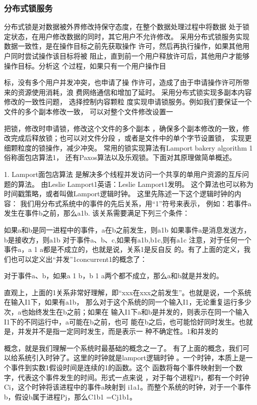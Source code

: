 \subsubsection*{分布式锁服务}
分布式锁是对数据被外界修改持保守态度，在整个数据处理过程中将数据
处于锁定状态，在用户修改数据的同时，其它用户不允许修改。
采用分布式锁服务实现数据一致性，是在操作目标之前先获取操作
许可，然后再执行操作，如果其他用户同时尝试操作该目标将被
阻止，直到前一个用户释放许可后，其他用户才能够操作目标。分析这
个过程，如果只有一个用户操作目

标，没有多个用户并发冲突，也申请了操
作许可，造成了由于申请操作许可所带来的资源使用消耗，浪
费网络通信和增加了延时。
采用分布式锁实现多副本内容修改的一致性问题， 选择控制内容颗粒
度实现申请锁服务。例如我们要保证一个文件的多个副本修改一致， 
可以对整个文件修改设置一

把锁，修改时申请锁，修改这个文件的多个副本
，确保多个副本修改的一致，修改完成后释放锁；也可以对文件分段
，或者是文件中的单个字节设置锁， 实现更细颗粒度的锁操作，减少冲突。
常用的锁实现算法有Lamport bakery algorithm 
1俗称面包店算法1， 还有Paxos算法以及乐观锁。下面对其原理做简单概述。

1. Lamport面包店算法
是解决多个线程并发访问一个共享的单用户资源的互斥问题的算法。
 由Leslie Lamport1英语：Leslie Lamport1发明。
这个算法也可以称为时间戳策略，或者叫做Lamport逻辑时钟。
这里先陈述一下这个逻辑时钟的内容：
我们用分布式系统中的事件的先后关系，用“1”符号来表示，
例如：若事件a发生在事件b之前，那么a1b.
该关系需要满足下列三个条件：

如果a和b是同一进程中的事件，a在b之前发生，则a1b
如果事件a是消息发送方，b是接收方，则a1b
对于事件a、b、c,如果有a1b,b1c,则有a1c
注意，对于任何一个事件a，a 1 a都是不成立的，也就是说，关系1是反自反
的。有了上面的定义，我们也可以定义出“并发”1concurrent1的概念了：

对于事件a、b，如果a 1 b，b 1 a两个都不成立，那么a和b就是并发的。

直观上，上面的1关系非常好理解，即“xxx在xxx之前发生”。也就是说，一个系统在输入I1下，如果有a1b，
那么对于这个系统的同一个输入I1，无论重复运行多少次，a也始终发生在b之前；如果在
输入I1下a和b是并发的，则表示在同一个输入I1下的不同运行中，a可能在b之前，也可
能在b之后，也可能恰好同时发生。也就是，并发并不是指一定同时发生，而是表示一
种不确定性。1和并发的

概念，就是我们理解一个系统时最基础的概念之一了。
有了上面的概念，我们可以给系统引入时钟了。这里的时钟就是lamport逻辑时钟
。一个时钟，本质上是一个事件到实数1假设时间是连续的1的函数。这个
函数将每个事件映射到一个数字，代表这个事件发生的时间。形式一点来说
，对于每个进程Pi，都有一个时钟Ci，这个时钟将该进程中的事件a映射到
i1a1。而整个系统的时钟，对于一个事件b，假设b属于进程Pj，那么C1b1 =Cj1b1。

